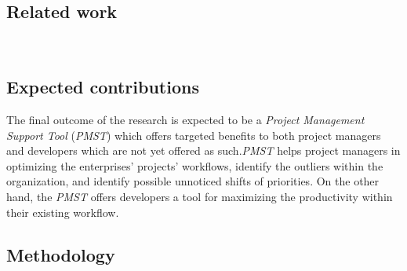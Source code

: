 \documentclass[a4paper, 12pt]{article}
\begin{document}




\subsection{Related work}


~\cite{RAYMOND2008213}

\subsection{Expected contributions}


The final outcome of the research is expected to be a \textit{Project Management Support Tool} (\textit{PMST}) which offers targeted benefits to both project managers and developers which are not yet offered as such.\textit{PMST} helps project managers in optimizing the enterprises' projects' workflows, identify the outliers within the organization, and identify possible unnoticed shifts of priorities. On the other hand, the \textit{PMST} offers developers a tool for maximizing the productivity within their existing workflow.

\subsection{Methodology}

\end{document}
